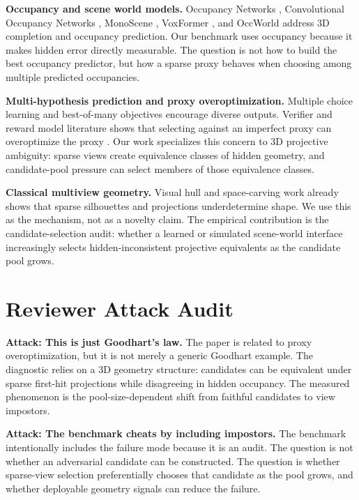 \documentclass{article}
\begin{document}
\textbf{Occupancy and scene world models.}
Occupancy Networks \cite{mescheder2019occupancy}, Convolutional Occupancy
Networks \cite{peng2020convocc}, MonoScene \cite{cao2022monoscene}, VoxFormer
\cite{li2023voxformer}, and OccWorld \cite{zheng2024occworld} address 3D
completion and occupancy prediction. Our benchmark uses occupancy because it
makes hidden error directly measurable. The question is not how to build the
best occupancy predictor, but how a sparse proxy behaves when choosing among
multiple predicted occupancies.

\textbf{Multi-hypothesis prediction and proxy overoptimization.}
Multiple choice learning \cite{guzman2012mcl} and best-of-many objectives
\cite{bhattacharyya2018best} encourage diverse outputs. Verifier and reward
model literature shows that selecting against an imperfect proxy can
overoptimize the proxy \cite{cobbe2021verifiers,lightman2023verify}. Our work
specializes this concern to 3D projective ambiguity: sparse views create
equivalence classes of hidden geometry, and candidate-pool pressure can select
members of those equivalence classes.

\textbf{Classical multiview geometry.}
Visual hull and space-carving work \cite{laurentini1994visual,kutulakos2000space}
already shows that sparse silhouettes and projections underdetermine shape. We
use this as the mechanism, not as a novelty claim. The empirical contribution
is the candidate-selection audit: whether a learned or simulated scene-world
interface increasingly selects hidden-inconsistent projective equivalents as
the candidate pool grows.

\section{Reviewer Attack Audit}

\textbf{Attack: This is just Goodhart's law.}
The paper is related to proxy overoptimization, but it is not merely a generic
Goodhart example. The diagnostic relies on a 3D geometry structure: candidates
can be equivalent under sparse first-hit projections while disagreeing in
hidden occupancy. The measured phenomenon is the pool-size-dependent shift
from faithful candidates to view impostors.

\textbf{Attack: The benchmark cheats by including impostors.}
The benchmark intentionally includes the failure mode because it is an audit.
The question is not whether an adversarial candidate can be constructed. The
question is whether sparse-view selection preferentially chooses that
candidate as the pool grows, and whether deployable geometry signals can reduce
the failure.
\end{document}
